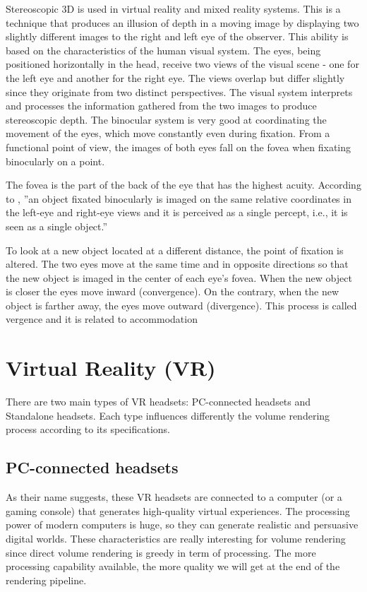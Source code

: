 Stereoscopic 3D is used in virtual reality and mixed reality systems.
This is a technique that produces an illusion of depth in a moving image by displaying two slightly different images to the right and left eye of the observer. This ability is based on the characteristics of the human visual system. The eyes, being positioned horizontally in the head, receive two views of the visual scene - one for the left eye and another for the right eye. The views overlap but differ slightly since they originate from two distinct perspectives. The visual system interprets and processes the information gathered from the two images to produce stereoscopic depth. The binocular system is very good at coordinating the movement of the eyes, which move constantly even during fixation. From a functional point of view, the images of both eyes fall on the fovea when fixating binocularly on a point. 


The fovea is the part of the back of the eye that has the highest acuity. According to \cite{5743036}, ''an object fixated binocularly is imaged on the same relative coordinates in the left-eye and right-eye views and it is perceived as a single percept, i.e., it is seen as a single object.''



To look at a new object located at a different distance, the point of fixation is altered. The two eyes move at the same time and in opposite directions so that the new object is imaged in the center of each eye's fovea. When the new object is closer the eyes move inward (convergence). On the contrary, when the new object is farther away, the eyes move outward (divergence). This process is called vergence and it is related to accommodation

\section{ Virtual Reality (VR)}

There are two main types of VR headsets: PC-connected headsets and Standalone headsets. Each type influences differently the volume rendering process according to its specifications.


\subsection{PC-connected headsets}

As their name suggests, these VR headsets are connected to a computer (or a gaming console) that generates high-quality virtual experiences. The processing power of modern computers is huge, so they can generate realistic and persuasive digital worlds. These characteristics are really interesting for volume rendering since direct volume rendering is greedy in term of processing. The more processing capability available, the more quality we will get at the end of the rendering pipeline. 

